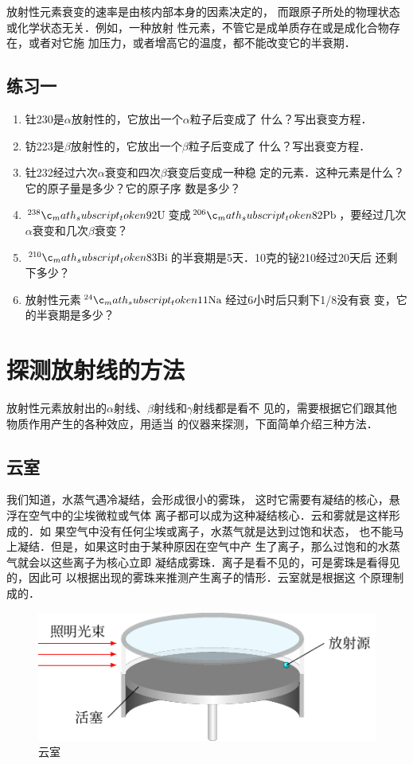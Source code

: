 放射性元素衰变的速率是由核内部本身的因素决定的，
而跟原子所处的物理状态或化学状态无关．例如，一种放射
性元素，不管它是成单质存在或是成化合物存在，或者对它施
加压力，或者增高它的温度，都不能改变它的半衰期．

\subsection*{练习一}
\begin{enumerate}
    \item 钍230是$\alpha$放射性的，它放出一个$\alpha$粒子后变成了
什么？写出衰变方程．
\item 钫223是$\beta$放射性的，它放出一个$\beta$粒子后变成了
什么？写出衰变方程．
\item 钍232经过六次$\alpha$衰变和四次$\beta$衰变后变成一种稳
定的元素．这种元素是什么？它的原子量是多少？它的原子序
数是多少？
\item 
$\atom{U}{238}{92}$变成$\atom{Pb}{206}{82}$，要经过几次$\alpha$衰变和几次$\beta$衰变？
\item 
$\atom{Bi}{210}{83}$的半衰期是5天．10克的铋210经过20天后
还剩下多少？
\item 放射性元素$\atom{Na}{24}{11}$经过6小时后只剩下1/8没有衰
变，它的半衰期是多少？
\end{enumerate}

\section{探测放射线的方法}
放射性元素放射出的$\alpha$射线、$\beta$射线和$\gamma$射线都是看不
见的，需要根据它们跟其他物质作用产生的各种效应，用适当
的仪器来探测，下面简单介绍三种方法．

\subsection{云室}
我们知道，水蒸气遇冷凝结，会形成很小的雾珠，
这时它需要有凝结的核心，悬浮在空气中的尘埃微粒或气体
离子都可以成为这种凝结核心．云和雾就是这样形成的．如
果空气中没有任何尘埃或离子，水蒸气就是达到过饱和状态，
也不能马上凝结．但是，如果这时由于某种原因在空气中产
生了离子，那么过饱和的水蒸气就会以这些离子为核心立即
凝结成雾珠．离子是看不见的，可是雾珠是看得见的，因此可
以根据出现的雾珠来推测产生离子的情形．云室就是根据这
个原理制成的．

\begin{figure}[htbp]
    \centering
    \includegraphics{fig/C/9-2.pdf}
    \caption{云室}\label{fig_C_9-2}
\end{figure}

